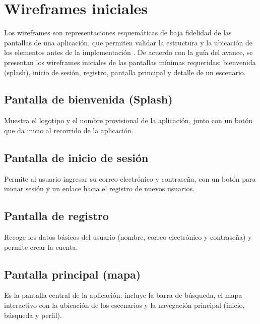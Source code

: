 
\section{Wireframes iniciales}

Los wireframes son representaciones esquem\'aticas de baja fidelidad de las
pantallas de una aplicaci\'on, que permiten validar la estructura y la
ubicaci\'on de los elementos antes de la implementaci\'on \citep{pressman2010,
nielsen1994}. De acuerdo con la gu\'ia del avance, se presentan los wireframes
iniciales de las pantallas m\'inimas requeridas: bienvenida (splash), inicio de
sesi\'on, registro, pantalla principal y detalle de un escenario.

\subsection{Pantalla de bienvenida (Splash)}

Muestra el logotipo y el nombre provisional de la aplicaci\'on, junto con un
bot\'on que da inicio al recorrido de la aplicaci\'on.

\subsection{Pantalla de inicio de sesi\'on}

Permite al usuario ingresar su correo electr\'onico y contrase\~na, con un bot\'on
para iniciar sesi\'on y un enlace hacia el registro de nuevos usuarios.

\subsection{Pantalla de registro}

Recoge los datos b\'asicos del usuario (nombre, correo electr\'onico y
contrase\~na) y permite crear la cuenta.

\subsection{Pantalla principal (mapa)}

Es la pantalla central de la aplicaci\'on: incluye la barra de b\'usqueda, el
mapa interactivo con la ubicaci\'on de los escenarios y la navegaci\'on
principal (inicio, b\'usqueda y perfil).

